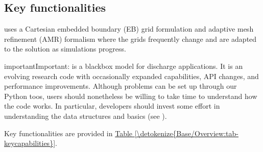 \documentclass[letterpaper,10pt,english]{sphinxmanual}
\begin{document}
\subsection{Key functionalities}
\label{\detokenize{Base/Overview:key-functionalities}}
 uses a Cartesian embedded boundary (EB) grid formulation and adaptive mesh refinement (AMR) formalism where the grids frequently change and are adapted to the solution as simulations progress.

\begin{sphinxadmonition}{important}{Important:}
 is  a black\sphinxhyphen{}box model for discharge applications.
It is an evolving research code with occasionally expanded capabilities, API changes, and performance improvements.
Although problems can be set up through our Python toos, users should nonetheless be willing to take time to understand how the code works.
In particular, developers should invest some effort in understanding the data structures and  basics (see {\hyperref[\detokenize{Source/ChomboBasics:chap-basics}]{}}).
\end{sphinxadmonition}

Key functionalities are provided in \hyperref[\detokenize{Base/Overview:tab-keycapabilities}]{Table \ref{\detokenize{Base/Overview:tab-keycapabilities}}}.
\end{document}

